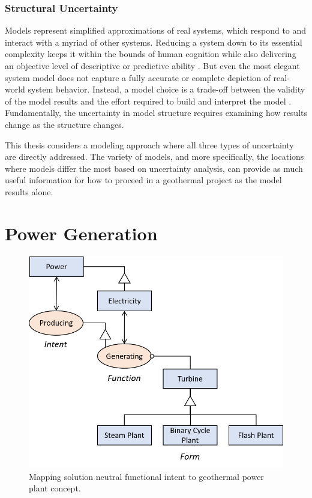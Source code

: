\subsubsection{Structural Uncertainty}\label{ch2:structural_uncertainty}
Models represent simplified approximations of real systems, which respond to and interact with a myriad of other systems. Reducing a system down to its essential complexity keeps it within the bounds of human cognition while also delivering an objective level of descriptive or predictive ability \citep[p.\ 306]{crawley_system_2015}. But even the most elegant system model does not capture a fully accurate or complete depiction of real-world system behavior. Instead, a model choice is a trade-off between the validity of the model results and the effort required to build and interpret the model \citep[p.\ 23]{morgan_best_2009}. Fundamentally, the uncertainty in model structure requires examining how results change as the structure changes.

This thesis considers a modeling approach where all three types of uncertainty are directly addressed. The variety of models, and more specifically, the locations where models differ the most based on uncertainty analysis, can provide as much useful information for how to proceed in a geothermal project as the model results alone.

\section{Power Generation}\label{ch2:power_gen}
\begin{figure}
\centering
\includegraphics[scale=0.65]{templates/images/Figure-PowerProduction-SolutionNeutral.png}
\singlespacing
\caption[Intent to concept for geothermal power plants]{Mapping solution neutral functional intent to geothermal power plant concept.}
\label{fig:solution_neutral}
\end{figure}

